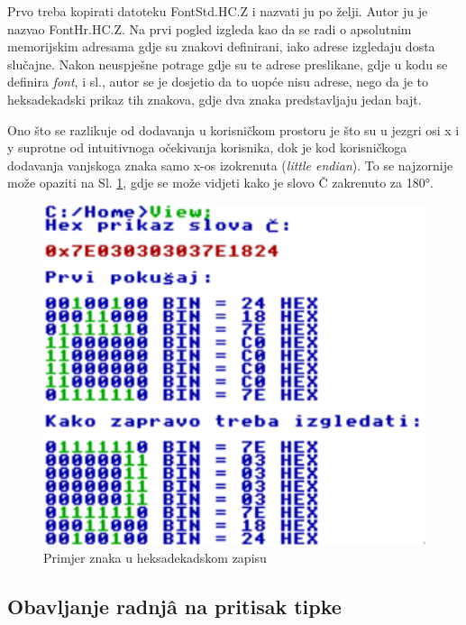 \documentclass{foi}
\begin{document}
Prvo treba kopirati datoteku {\selectfont FontStd.HC.Z} i nazvati ju po želji. Autor ju je nazvao {\selectfont FontHr.HC.Z}. Na prvi pogled izgleda kao da se radi o apsolutnim memorijskim adresama gdje su znakovi definirani, iako adrese izgledaju dosta slučajne. Nakon neuspješne potrage gdje su te adrese preslikane, gdje u kodu se definira \emph{font}, i sl., autor se je dosjetio da to uopće nisu adrese, nego da je to heksadekadski prikaz tih znakova, gdje dva znaka predstavljaju jedan bajt.

Ono što se razlikuje od dodavanja u korisničkom prostoru je što su u jezgri osi x i y suprotne od intuitivnoga očekivanja korisnika, dok je kod korisničkoga dodavanja vanjskoga znaka samo x-os izokrenuta (\emph{little endian}). To se najzornije može opaziti na Sl. \ref{fig:fontchar}, gdje se može vidjeti kako je slovo {\selectfont Č} zakrenuto za 180°.

\begin{figure}[H]
    \centering
    \includegraphics[width=1.0\textwidth]{slike/fontchar.png}
    \caption{Primjer znaka u heksadekadskom zapisu}
    \label{fig:fontchar}
\end{figure}

\subsection{Obavljanje radnjâ na pritisak tipke\label{obavljanjeRadnjiNaPritisak}}
\end{document}
